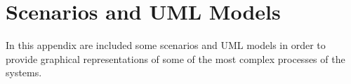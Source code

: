 \chapter{Scenarios and UML Models}
In this appendix are included some scenarios and UML models in order to provide graphical representations of some of the most complex processes of the systems.





